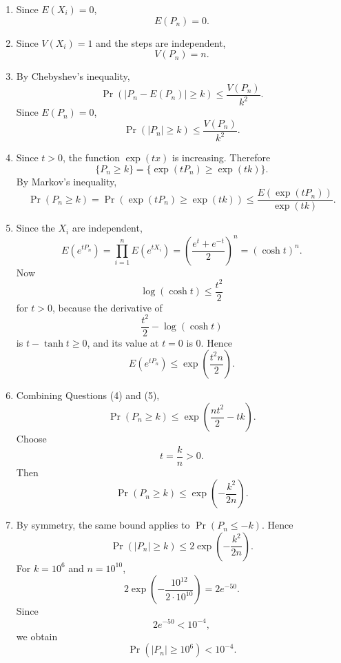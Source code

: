 \documentclass[10pt,a4paper]{article}
\begin{document}
\begin{enumerate}
  \item Since $E(X_i)=0$,
        \[
          \boxed{E(P_n)=0.}
        \]

  \item Since $V(X_i)=1$ and the steps are independent,
        \[
          \boxed{V(P_n)=n.}
        \]

  \item By Chebyshev's inequality,
        \[
          \Pr(|P_n-E(P_n)|\geq k)\leq\frac{V(P_n)}{k^2}.
        \]
        Since $E(P_n)=0$,
        \[
          \boxed{
          \Pr(|P_n|\geq k)\leq\frac{V(P_n)}{k^2}.}
        \]

  \item Since $t>0$, the function $\exp(tx)$ is increasing. Therefore
        \[
          \{P_n\geq k\}
          =
          \{\exp(tP_n)\geq \exp(tk)\}.
        \]
        By Markov's inequality,
        \[
          \boxed{
          \Pr(P_n\geq k)
          =
          \Pr(\exp(tP_n)\geq \exp(tk))
          \leq
          \frac{E(\exp(tP_n))}{\exp(tk)}.}
        \]

  \item Since the $X_i$ are independent,
        \[
          E(e^{tP_n})
          =
          \prod_{i=1}^nE(e^{tX_i})
          =
          \left(\frac{e^t+e^{-t}}{2}\right)^n
          =
          (\cosh t)^n.
        \]
        Now
        \[
          \log(\cosh t)\leq \frac{t^2}{2}
        \]
        for $t>0$, because the derivative of
        \[
          \frac{t^2}{2}-\log(\cosh t)
        \]
        is $t-\tanh t\geq0$, and its value at $t=0$ is $0$. Hence
        \[
          \boxed{
          E(e^{tP_n})\leq \exp\left(\frac{t^2n}{2}\right).}
        \]

  \item Combining Questions (4) and (5),
        \[
          \Pr(P_n\geq k)
          \leq
          \exp\left(\frac{nt^2}{2}-tk\right).
        \]
        Choose
        \[
          t=\frac{k}{n}>0.
        \]
        Then
        \[
          \Pr(P_n\geq k)
          \leq
          \boxed{
          \exp\left(-\frac{k^2}{2n}\right).}
        \]

  \item By symmetry, the same bound applies to $\Pr(P_n\leq -k)$. Hence
        \[
          \Pr(|P_n|\geq k)
          \leq
          2\exp\left(-\frac{k^2}{2n}\right).
        \]
        For $k=10^6$ and $n=10^{10}$,
        \[
          2\exp\left(-\frac{10^{12}}{2\cdot10^{10}}\right)
          =
          2e^{-50}.
        \]
        Since
        \[
          2e^{-50}<10^{-4},
        \]
        we obtain
        \[
          \boxed{
          \Pr(|P_n|\geq 10^6)<10^{-4}.}
        \]
\end{enumerate}
\end{document}
